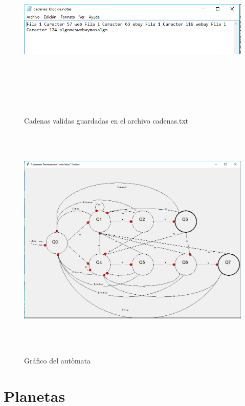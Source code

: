 \documentclass[12pt]{article}
\begin{document}
\begin{figure}[H]
\begin{center}
\includegraphics[width=\textwidth, height=8cm]{manual_webay_cadenas}
\label{ }
\caption{Cadenas validas guardadas en el archivo cadenas.txt}
\end{center}
\end{figure}


\begin{figure}[H]
\begin{center}
\includegraphics[width=\textwidth, height=11cm]{webay_grafico}
\label{ }
\caption{Gráfico del autòmata}
\end{center}
\end{figure}


\newpage
\section{Planetas}
\end{document}

